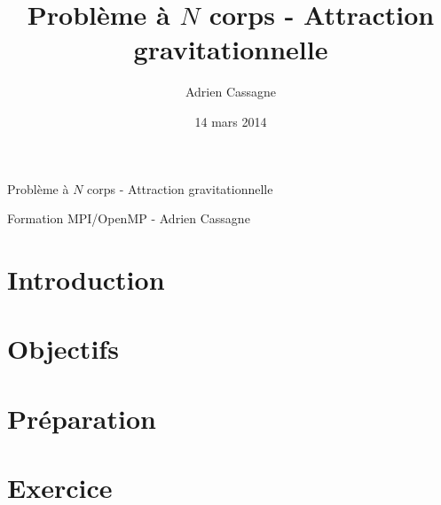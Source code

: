 \documentclass[a4paper,11pt,answers,11pt]{exam}
\title{Problème à $N$ corps - Attraction gravitationnelle}
\author{Adrien Cassagne}
\date{14 mars 2014}
\begin{document}
\begin{title}
\noindent{}
\begin{center}
	{\Large{Problème à $N$ corps - Attraction gravitationnelle}}\\
\end{center}
\begin{center}
	{\footnotesize{Formation MPI/OpenMP - Adrien {\sc Cassagne}}}
\end{center}
\end{title}

\setcounter{page}{1}
\section {Introduction}


\section {Objectifs}


\section {Préparation}


\section {Exercice}

\end{document}
